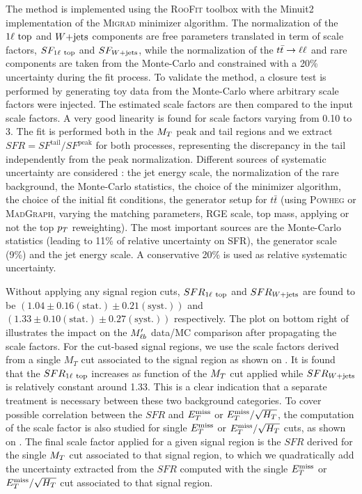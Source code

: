     The method is implemented using the \textsc{RooFit} toolbox \cite{RooFit} with the Minuit2
    implementation of the \textsc{Migrad} minimizer algorithm. The normalization
    of the $1\ell~\text{top}$ and $\text{$W$+jets}$ components are free parameters translated in term
    of scale factors, $SF_{1\ell~\text{top}}$ and $SF_{\text{$W$+jets}}$, while the normalization of
    the $t\bar{t} \rightarrow \ell \ell$ and rare components are taken from the Monte-Carlo and constrained
    with a 20\% uncertainty during the fit process. To validate the method, a closure test
    is performed by generating toy data from the Monte-Carlo where arbitrary scale factors
    were injected. The estimated scale factors are then compared to the input scale factors.
    A very good linearity is found for scale factors varying from 0.10 to 3. The fit is
    performed both in the $M_T$ peak and tail regions and we extract $SFR = SF^{\text{tail}}
    / SF^{\text{peak}}$ for both processes, representing the discrepancy in the tail
    independently from the peak normalization. Different sources of systematic uncertainty
    are considered : the jet energy scale, the normalization of the rare background, the
    Monte-Carlo statistics, the choice of the minimizer algorithm, the choice of the
    initial fit conditions, the generator setup for $t\bar{t}$ (using \textsc{Powheg} or
    \textsc{MadGraph}, varying the matching parameters, RGE scale, top mass, applying or
    not the top $p_T$ reweighting). The most important sources are the Monte-Carlo statistics
    (leading to 11\% of relative uncertainty on SFR), the generator scale (9\%) and the jet
    energy scale. A conservative 20\% is used as relative systematic uncertainty.

    Without applying any signal region cuts, $SFR_{1\ell~\text{top}}$ and $SFR_{\text{$W$+jets}}$ are found
    to be $(1.04 \pm 0.16 (\text{stat.}) \pm 0.21 (\text{syst.}))$ and $(1.33 \pm 0.10
    (\text{stat.}) \pm 0.27 (\text{syst.}) )$ respectively. The plot on bottom right
    of 
    illustrates the impact on the $M'_{\ell b}$ data/MC comparison after propagating the scale
    factors. For the cut-based signal regions, we use the scale factors derived from a
    single $M_T$ cut associated to the signal region as shown on .
    It is found that the $SFR_{1\ell~\text{top}}$ increases as function of the $M_T$ cut applied
    while $SFR_{\text{$W$+jets}}$ is relatively constant around 1.33. This is a clear indication that
    a separate treatment is necessary between these two background categories.
    To cover possible correlation between the $SFR$ and $E_T^\text{miss}$ or $E_T^\text{miss}/\sqrt{H_T}$, the
    computation of the scale factor is also studied for single $E_T^\text{miss}$ or $E_T^\text{miss}/\sqrt{H_T}$ cuts,
    as shown on .
    The final scale factor applied for a given signal region is the $SFR$ derived
    for the single $M_T$ cut associated to that signal region, to which we quadratically add
    the uncertainty extracted from the $SFR$ computed with the single $E_T^\text{miss}$ or
    $E_T^\text{miss}/\sqrt{H_T}$ cut associated to that signal region.

